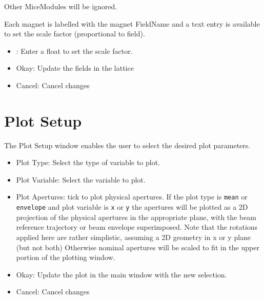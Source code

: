 Other MiceModules will be ignored.

Each magnet is labelled with the magnet FieldName and a text entry is available
to set the scale factor (proportional to field).

\begin{itemize}
\item <field entries>: Enter a float to set the scale factor.
\item Okay: Update the fields in the lattice
\item Cancel: Cancel changes
\end{itemize}

\section{Plot Setup}
The Plot Setup window enables the user to select the desired plot parameters.

\begin{itemize}
\item Plot Type: Select the type of variable to plot.
\item Plot Variable: Select the variable to plot.
\item Plot Apertures: tick to plot physical apertures. If the plot type is
\verb|mean| or \verb|envelope| and plot variable is \verb|x| or \verb|y| the 
apertures will be 
plotted as a 2D projection of the physical apertures in the appropriate plane,
with the beam reference trajectory or beam envelope superimposed. Note that the
rotations applied here are rather simplistic, assuming a 2D geometry in x or y
plane (but not both) Otherwise nominal apertures will be scaled to fit in the 
upper portion of the plotting window.
\item Okay: Update the plot in the main window with the new selection.
\item Cancel: Cancel changes
\end{itemize}


